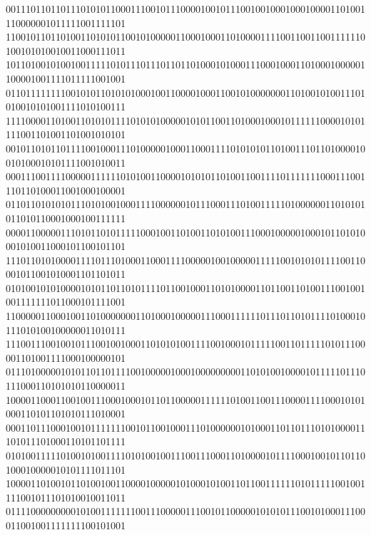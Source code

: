 \documentclass[10pt,\tflang,pdftex]{book}
\begin{document}
{{\begin{minipage}{\oldpwidth}
{{{{001110110110111010101100011100101110000100101110010010001000100001101001110000001011111001111101\\
110010110110100110101011001010000011000100011010000111100110011001111110100101010010011000111011\\
101101001010010011111010111011101101101000101000111000100011010001000001100001001111011111001001\\
011011111111001010110101010001001100001000110010100000001101001010011101010010101001111010100111\\
111100001101001101010111101010100000101011001101000100010111111000010101111001101001101001010101\\
001011010110111100100011101000001000110001111010101011010011101101000010010100010101111001010011\\
000111001111000001111110101001100001010101101001100111101111111000111001110110100011001000100001\\
011011010101011101010010001111000000101110001110100111110100000011010101011010110001000100111111\\
000011000001110101101011111000100110100110101001110001000001000101101010001010011000101100101101\\
111011010100001111011101000110001111000001001000001111100101010111100110001011001010001101101011\\
010100101010000101011011010111101100100011010100001101100110100111001001001111111011000101111001\\
110000011000100110100000001101000100000111000111111011101101011110100010111010100100000011010111\\
111001110010010111001001000110101010011110010001011111001101111101011100001101001111000100000101\\
011101000001010110110111100100000100010000000001101010010000101111101110111000110101010110000011\\
100001100011001001110001000101101100000111111010011001110000111100010101000110101101010111010001\\
000110111000100101111111001011001000111010000001010001101101110101000011101011101000110101101111\\
010100111110100101001111010100100111001110001101000010111100010010110110100010000010101111011101\\
100001101001011010010011000010000010100010100110110011111101011111001001111001011101010010011011\\
011110000000001010011111110011100000111001011000001010101110010100011100011001001111111100101001\\
}}}}
\end{minipage}}}
\end{document}
